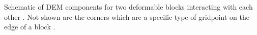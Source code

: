 \label{fig:dem} Schematic of DEM components for two deformable blocks interacting with each other \cite{itasca_udec_2011}. Not shown are the corners which are a specific type of gridpoint on the edge of a block .
